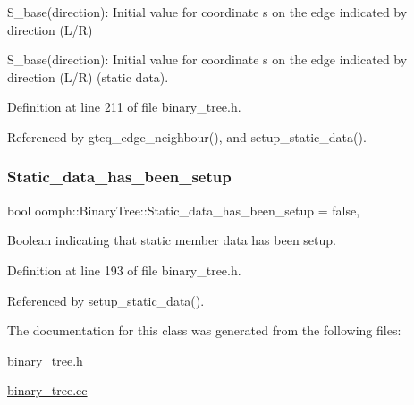 S\+\_\+base(direction)\+: Initial value for coordinate s on the edge indicated by direction (L/R) 

S\+\_\+base(direction)\+: Initial value for coordinate s on the edge indicated by direction (L/R) (static data). 

Definition at line 211 of file binary\+\_\+tree.\+h.



Referenced by gteq\+\_\+edge\+\_\+neighbour(), and setup\+\_\+static\+\_\+data().

\mbox{\label{classoomph_1_1BinaryTree_a5890507c23970c4e2604fb65a546b9b4}} 
\subsubsection{\texorpdfstring{Static\+\_\+data\+\_\+has\+\_\+been\+\_\+setup}{Static\_data\_has\_been\_setup}}
{\footnotesize\ttfamily bool oomph\+::\+Binary\+Tree\+::\+Static\+\_\+data\+\_\+has\+\_\+been\+\_\+setup = false\hspace{0.3cm}{\ttfamily [static]}, {\ttfamily [protected]}}



Boolean indicating that static member data has been setup. 



Definition at line 193 of file binary\+\_\+tree.\+h.



Referenced by setup\+\_\+static\+\_\+data().



The documentation for this class was generated from the following files\+:\begin{DoxyCompactItemize}
\item 
\hyperlink{binary__tree_8h}{binary\+\_\+tree.\+h}\item 
\hyperlink{binary__tree_8cc}{binary\+\_\+tree.\+cc}\end{DoxyCompactItemize}
